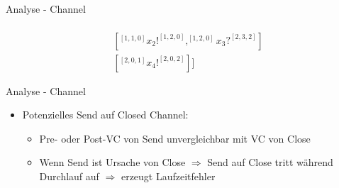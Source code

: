 \documentclass[aspectratio=169]{beamer}  %
\begin{document}
\begin{frame}{Analyse - Channel}
  \begin{minipage}{0.49\textwidth}
    \begin{align*}
      [&[^{[2,0,0]}x_1?^{[3,2,0]}]\\
      &[^{[1, 1, 0]}x_2!^{[1, 2, 0]}, ^{[1, 2, 0]}x_3?^{[2, 3, 2]}]\\
      &[^{[2, 0, 1]}x_4!^{[2, 0, 2]}]]
    \end{align*}
    \end{minipage}
    \hfill
    \hfill
    \begin{minipage}{0.24\textwidth}
    \end{minipage}
    \hfill
    \begin{minipage}{0.24\textwidth}
    \end{minipage}
\end{frame}

\begin{frame}{Analyse - Channel}
  \begin{itemize}
    \item Potenzielles Send auf Closed Channel:
    \begin{itemize}
      \item Pre- oder Post-VC von Send unvergleichbar mit VC von Close
      \item Wenn Send ist Ursache von Close $\Rightarrow$ Send auf Close tritt 
      während Durchlauf auf $\Rightarrow$ erzeugt Laufzeitfehler
    \end{itemize}
  \end{itemize}
\end{frame}
\end{document}
